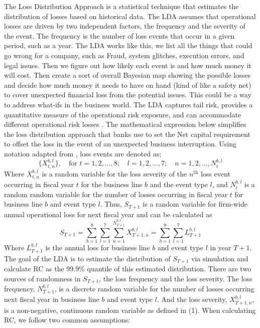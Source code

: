 The Loss Distribution Approach is a statistical technique that estimates the distribution of losses based on historical data. The LDA assumes that operational losses are driven by two independent factors, the frequency and the severity of the event. The frequency is the number of loss events that occur in a given period, such as a year. The LDA works like this, we list all the things that could go wrong for a company, such as Fraud, system glitches, execution errors, and legal issues. Then we figure out how likely each event is and how much money it will cost. Then create a sort of overall Bayesian map showing the possible losses and decide how much money it needs to have on hand (kind of like a safety net) to cover unexpected financial loss from the potential issues. This could be a way to address what-ifs in the business world. The LDA captures tail risk, provides a quantitative measure of the operational risk exposure, and can accommodate different operational risk losses \parencite{hadley_selection_2019}. The mathematical expression below simplifies the loss distribution approach that banks use to set the Net capital requirement to offset the loss in the event of an unexpected business interruption. Using notation adapted from \textcite{embrechts2011modelling}, loss events are denoted as; 
\begin{equation}
\{X_{t,n}^{b,l}\}, \quad \text{for } t = 1, 2, \dots, 8; \quad l = 1, 2, \dots, 7; \quad n = 1, 2, \dots, N_t^{b,l}
\end{equation}
Where \( X_{t,n}^{b,l} \) is a random variable for the loss severity of the \(n^{\text{th}}\) loss event occurring in fiscal year \(t\) for the business line \(b\) and the event type \(l\), and \( N_t^{b,l} \) is a random random variable for the number of losses occurring in fiscal year \(t\) for business line \(b\) and event type \(l\). Thus, \( S_{T+1} \) is a random variable for firm-wide annual operational loss for next fiscal year and can be calculated as
\begin{equation}
S_{T+1} = \sum_{b=1}^8 \sum_{l=1}^7 \sum_{n=1}^{N_{T+1}^{b,l}} X_{T+1,n}^{b,l} = \sum_{b=1}^8 \sum_{l=1}^7 L_{T+1}^{b,l} 
\end{equation}
Where \( L_{T+1}^{b,l} \) is the annual loss for business line \(b\) and event type \(l\) in year \( T + 1 \). The goal of the LDA is to estimate the distribution of \( S_{T+1} \) via simulation and calculate RC as the 99.9\% quantile of this estimated distribution. There are two sources of randomness in \( S_{T+1} \), the loss frequency and the loss severity. The loss frequency, \( N_{T+1}^{b,l} \), is a discrete random variable for the number of losses occurring next fiscal year in business line \(b\) and event type \(l\). And the loss severity, \( X_{T+1,n}^{b,l} \), is a non-negative, continuous random variable as defined in (1). When calculating RC, we follow two common assumptions:

